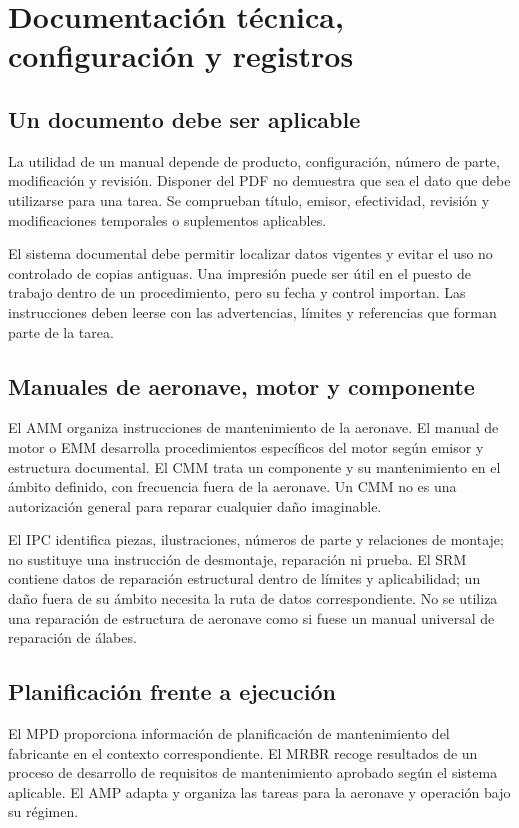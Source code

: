 \chapter{Documentación técnica, configuración y registros}\label{ch:20}
\section{Un documento debe ser aplicable}
La utilidad de un manual depende de producto, configuración, número de parte, modificación y revisión. Disponer del PDF no demuestra que sea el dato que debe utilizarse para una tarea. Se comprueban título, emisor, efectividad, revisión y modificaciones temporales o suplementos aplicables.

El sistema documental debe permitir localizar datos vigentes y evitar el uso no controlado de copias antiguas. Una impresión puede ser útil en el puesto de trabajo dentro de un procedimiento, pero su fecha y control importan. Las instrucciones deben leerse con las advertencias, límites y referencias que forman parte de la tarea.
\section{Manuales de aeronave, motor y componente}
El AMM organiza instrucciones de mantenimiento de la aeronave. El manual de motor o EMM desarrolla procedimientos específicos del motor según emisor y estructura documental. El CMM trata un componente y su mantenimiento en el ámbito definido, con frecuencia fuera de la aeronave. Un CMM no es una autorización general para reparar cualquier daño imaginable.

El IPC identifica piezas, ilustraciones, números de parte y relaciones de montaje; no sustituye una instrucción de desmontaje, reparación ni prueba. El SRM contiene datos de reparación estructural dentro de límites y aplicabilidad; un daño fuera de su ámbito necesita la ruta de datos correspondiente. No se utiliza una reparación de estructura de aeronave como si fuese un manual universal de reparación de álabes.
\section{Planificación frente a ejecución}
El MPD proporciona información de planificación de mantenimiento del fabricante en el contexto correspondiente. El MRBR recoge resultados de un proceso de desarrollo de requisitos de mantenimiento aprobado según el sistema aplicable. El AMP adapta y organiza las tareas para la aeronave y operación bajo su régimen.

